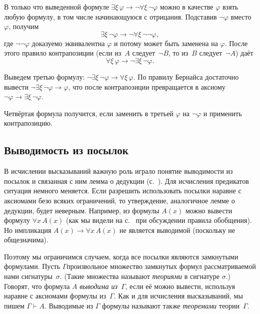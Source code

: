 \begin{itemize}
В только что выведенной формуле
$\exists\xi\,\varphi\to\lnot\forall\xi\,\lnot\varphi$ можно в
качестве $\varphi$ взять любую формулу, в том числе начинающуюся
с отрицания. Подставив $\lnot\varphi$ вместо $\varphi$, получим
        $$
\exists\xi\,\lnot\varphi\to\lnot\forall\xi\,\lnot\lnot\varphi,
        $$
где $\lnot\lnot\varphi$ доказуемо эквивалентна $\varphi$ и
потому может быть заменена на $\varphi$. После этого правило
контрапозиции (если из~$A$ следует~$\lnot B$, то из~$B$
следует~$\lnot A$) даёт
        $$
\forall \xi\,\varphi \to \lnot\exists\xi\,\lnot \varphi.
        $$

Выведем третью формулу:
$\lnot\exists\xi\,\lnot\varphi\to\forall\xi\,\varphi$. По
правилу Бернайса достаточно вывести
$\lnot\exists\xi\,\lnot\varphi\to\varphi$, что после
контрапозиции превращается в аксиому
$\lnot\varphi\to\exists\xi\,\lnot\varphi$.

Четвёртая формула получится, если заменить в третьей $\varphi$
на $\lnot\varphi$ и применить контрапозицию.
\end{itemize}

\subsection*{Выводимость из посылок}

В исчислении высказываний важную роль играло понятие выводимости
из посылок и связанная с ним лемма о дедукции
(с.~\pageref{deduction-lemma}). Для исчисления предикатов
ситуация немного меняется. Если разрешить использовать посылки
наравне с аксиомами безо всяких ограничений, то утверждение,
аналогичное лемме о дедукции, будет неверным. Например, из
формулы $A(x)$ можно вывести формулу $\forall x\, A(x)$ (как мы
видели на с.~\pageref{generalization} при обсуждении правила
обобщения). Но импликация $A(x)\to\forall x\,A(x)$ не является
выводимой (поскольку не общезначима).

Поэтому мы ограничимся случаем, когда все посылки являются
замкнутыми формулами. Пусть $\Gamma$\т произвольное множество
замкнутых формул рассматриваемой нами сигнатуры~$\sigma$. (Такие
множества называют \emph{теориями} в
сигнатуре $\sigma$.) Говорят, что формула $A$ \emph{выводима
из~$\Gamma$},%
если её можно вывести, используя наравне с аксиомами формулы
из~$\Gamma$. Как и для исчисления высказываний, мы пишем
$\Gamma\vdash A$. Выводимые из $\Gamma$ формулы называют также
\emph{теоремами} теории~$\Gamma$.

